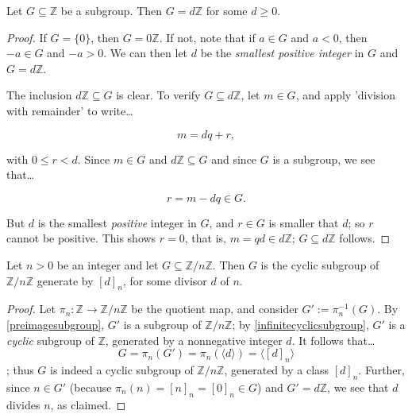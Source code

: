 \begin{proposition}
\label{infinitecyclicsubgroup}
Let $G \subseteq \mathbb{Z}$ be a subgroup. Then $G = d\mathbb{Z}$ for some $d \geq 0$.
\end{proposition}

\begin{proof}
If $G = \{ 0 \}$, then $G = 0\mathbb{Z}$. If not, note that if $a \in G$ and $a < 0$, then $-a \in G$ and $-a > 0$.
We can then let $d$ be the \emph{smallest positive integer} in $G$ and $G = d\mathbb{Z}$.

The inclusion $d\mathbb{Z} \subseteq G$ is clear. To verify $G \subseteq d\mathbb{Z}$, let $m \in G$, and apply 'division with remainder'
to write\dots

$$m = dq + r,$$

with $0 \leq r < d$. Since $m \in G$ and $d\mathbb{Z} \subseteq G$ and since $G$ is a subgroup, we see that\dots

$$r = m - dq \in G.$$

But $d$ is the smallest \emph{positive} integer in $G$, and $r \in G$ is smaller that $d$; so $r$ cannot be positive. This shows $r = 0$, that is,
$m = qd \in d\mathbb{Z}$; $G \subseteq d\mathbb{Z}$ follows.
\end{proof}

\begin{proposition}
\label{subgroupsofcyclicgroups}
Let $n > 0$ be an integer and let $G \subseteq \mathbb{Z}/n\mathbb{Z}$. Then $G$ is the cyclic subgroup of $\mathbb{Z}/n\mathbb{Z}$ generate by $[d]_n$,
for some divisor $d$ of $n$.
\end{proposition}

\begin{proof}
Let $\pi_n : \mathbb{Z} \rightarrow \mathbb{Z}/n\mathbb{Z}$ be the quotient map, and consider $G' := \pi_n^{-1}(G).$
By \ref{preimagesubgroup}, $G'$ is a subgroup of $\mathbb{Z}/n\mathbb{Z}$; by \ref{infinitecyclicsubgroup}, $G'$ is a
\emph{cyclic} subgroup of $\mathbb{Z}$, generated by a nonnegative integer $d$. It follows that\dots
$$G = \pi_n(G') = \pi_n(\langle d \rangle) = \langle [d]_n \rangle$$;
thus $G$ is indeed a cyclic subgroup of $\mathbb{Z}/n\mathbb{Z}$, generated by a class $[d]_n$. Further, since
$n \in G'$ (because $\pi_n(n) = [n]_n = [0]_n \in G$) and $G' = d\mathbb{Z}$, we see that $d$ divides $n$, as
claimed.
\end{proof}
